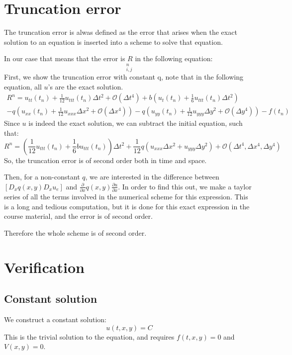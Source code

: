 \documentclass[a4paper]{article}
\begin{document}
\section{Truncation error}
The truncation error is alwas defined as the error that arises when the exact solution to an equation is inserted into a scheme to solve that equation.

In our case that means that the error is $R$ in the following equation:
\begin{equation}
	[D_tD_t u_e + bD_tu_e = D_xqD_xu_e + D_yqD_yu_e + f + R]_{i,j}^n
\end{equation}
First, we show the truncation error with constant q, note that in the following equation, all $u$'s are the exact solution.
\begin{eqnarray*}
R^n = u_{tt}(t_n) + \frac{1}{12}u_{ttt}(t_n) \Delta t^2 + \mathcal{O}(\Delta t^4)
+ b(u_t(t_n) + \frac{1}{6}u_{ttt}(t_n) \Delta t^2) \\
- q(u_{xx}(t_n) + \frac{1}{12}u_{xxx}\Delta x^2 + \mathcal{O}(\Delta x^4))
- q(u_{yy}(t_n) + \frac{1}{12}u_{yyy}\Delta y^2 + \mathcal{O}(\Delta y^4))
- f(t_n)
\end{eqnarray*}
Since $u$ is indeed the exact solution, we can subtract the initial equation, such that:
\begin{equation}
R^n = \left(\frac{1}{12}u_{ttt}(t_n) + \frac{1}{6}bu_{ttt}(t_n)\right)\Delta t^2 
+ \frac{1}{12}q\left(u_{xxx}\Delta x^2 + u_{yyy}\Delta y^2 \right) + \mathcal{O}(\Delta t^4, \Delta x^4, \Delta y^4)
\end{equation}
So, the truncation error is of second order both in time and space. 

Then, for a non-constant $q$, we are interested in the difference between $[D_xq(x, y)D_x u_e]$ and $\frac{\partial}{\partial x} q(x, y) \frac{\partial u}{\partial x}$. In order to find this out, we make a taylor series of all the terms involved in the numerical scheme for this expression. This is a long and tedious computation, but it is done for this exact expression in the course material, and the error is of second order.

Therefore the whole scheme is of second order. 

\section{Verification}
\subsection{Constant solution}
We construct a constant solution:
\begin{equation}
u(t, x, y) = C
\end{equation}
This is the trivial solution to the equation, and requires $f(t, x, y) = 0$ and $V(x, y) = 0$. 
\end{document}
